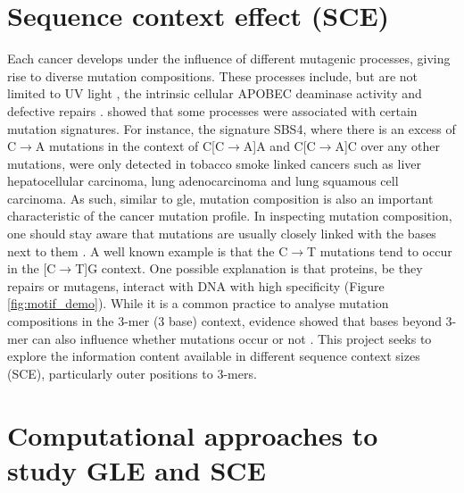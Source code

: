 

\section{Sequence context effect (SCE)}
\label{intro:sce}

Each cancer develops under the influence of different mutagenic processes, giving rise to diverse mutation compositions. These processes include, but are not limited to UV light \citep[known in skin melanoma;][]{Mohania2017}, the intrinsic cellular APOBEC deaminase activity \citep[\textit{e.g.} in B cells;][]{Kuppers2005MechanismsPathogenesis} and defective repairs \citep[\textit{e.g.} mutated \textit{BRCA} genes in breast cancer;][]{Navasardyan2021YY1TNBC}. \citet{Alexandrov2013, Alexandrov2020} showed that some processes were associated with certain mutation signatures. For instance, the signature SBS4, where there is an excess of C$\rightarrow$A mutations in the context of C[C$\rightarrow$A]A and C[C$\rightarrow$A]C over any other mutations, were only detected in tobacco smoke linked cancers such as liver hepatocellular carcinoma, lung adenocarcinoma and lung squamous cell carcinoma. As such, similar to \gls{gle}, mutation composition is also an important characteristic of the cancer mutation profile. In inspecting mutation composition, one should stay aware that mutations are usually closely linked with the \glspl{base} next to them \citep{Zhu2017}. A well known example is that the C$\rightarrow$T mutations tend to occur in the [C$\rightarrow$T]G context. One possible explanation is that proteins, be they repairs or mutagens, interact with DNA with high specificity (Figure \ref{fig:motif_demo}). While it is a common practice to analyse mutation compositions in the 3-mer (3 base) context, evidence showed that bases beyond 3-mer can also influence whether mutations occur or not \citep{Zhu2017,Zhu2020}. This project seeks to explore the information content available in different sequence context sizes (SCE), particularly outer positions to 3-mers.



\section{Computational approaches to study GLE and SCE}
\label{intro:ml}

